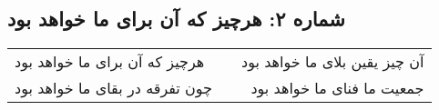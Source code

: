 \begin{center}
\section*{شماره ۲: هرچیز که آن برای ما خواهد بود}
\label{sec:002}
\begin{longtable}{l p{0.5cm} r}
هرچیز که آن برای ما خواهد بود
&&
آن چیز یقین بلای ما خواهد بود
\\
چون تفرقه در بقای ما خواهد بود
&&
جمعیت ما فنای ما خواهد بود
\\
\end{longtable}
\end{center}
